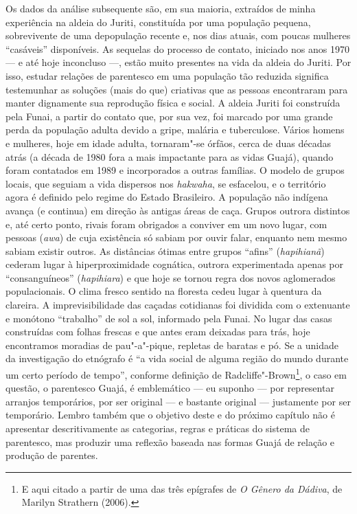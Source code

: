 Os dados da análise subsequente são, em sua maioria, extraídos de minha
experiência na aldeia do  Juriti, constituída por uma população
pequena, sobrevivente de uma depopulação recente e, nos dias atuais, com
poucas mulheres ``casáveis'' disponíveis. As sequelas do processo de
contato, iniciado nos anos 1970 --- e até hoje inconcluso ---, estão muito
presentes na vida da aldeia do  Juriti. Por isso, estudar relações de
parentesco em uma população tão reduzida significa testemunhar as
soluções (mais do que) criativas que as pessoas encontraram para manter
dignamente sua reprodução física e social. A aldeia Juriti foi
construída pela Funai, a partir do contato que, por sua vez, foi marcado
por uma grande perda da população adulta devido a gripe, malária e
tuberculose. Vários homens e mulheres, hoje em idade adulta, tornaram"-se
órfãos, cerca de duas décadas atrás (a década de 1980 fora a mais
impactante para as vidas Guajá), quando foram contatados em 1989 e
incorporados a outras famílias. O modelo de grupos locais, que seguiam a
vida dispersos nos \emph{hakwaha}, se esfacelou, e o território agora é
definido pelo regime do Estado Brasileiro. A população não indígena
avança (e continua) em direção às antigas áreas de caça. Grupos outrora
distintos e, até certo ponto, rivais foram obrigados a conviver em um
novo lugar, com pessoas (\emph{awa}) de cuja existência só sabiam por
ouvir falar, enquanto nem mesmo sabiam existir outros. As distâncias
ótimas entre grupos ``afins'' (\emph{hapihianã}) cederam lugar à
hiperproximidade cognática, outrora experimentada apenas por
``consanguíneos'' (\emph{hapihiara}) e que hoje se tornou regra dos novos
aglomerados populacionais. O clima fresco sentido na floresta cedeu
lugar à quentura da clareira. A imprevisibilidade das caçadas cotidianas
foi dividida com o extenuante e monótono ``trabalho'' de sol a sol,
informado pela Funai. No lugar das casas construídas com folhas frescas
e que antes eram deixadas para trás, hoje encontramos moradias de
pau"-a"-pique, repletas de baratas e pó. Se a unidade da investigação do
etnógrafo é ``a vida social de alguma região do mundo durante um certo
período de tempo'', conforme definição de Radcliffe"-Brown\footnote{E aqui
  citado a partir de uma das três epígrafes de \emph{O Gênero da
  Dádiva}, de Marilyn Strathern (2006).}, o caso em questão, o
parentesco Guajá, é emblemático --- eu suponho --- por representar arranjos
temporários, por ser original --- e bastante original --- justamente por ser
temporário. Lembro também que o objetivo deste e do próximo capítulo não
é apresentar descritivamente as categorias, regras e práticas do sistema
de parentesco, mas produzir uma reflexão baseada nas formas Guajá de
relação e produção de parentes.

